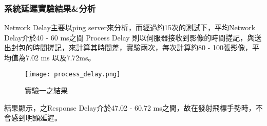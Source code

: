 \subsubsection{系統延遲實驗結果\&分析}
Network Delay主要以ping server來分析，而經過約15次的測試下，平均Network Delay介於40 - 60 ms之間
Process Delay 則以伺服器接收到影像的時間搓記，與送出封包的時間搓記，來計算其時間差，實驗兩次，每次計算約80 - 100張影像，平均值為7.02 ms 以及7.72ms。

\begin{figure}[h]
    \centering	
    \texttt{[image: process\_delay.png]}
    \caption{實驗一之結果}
    \label{fig:Process delay bar chart}
\end{figure}

結果顯示，之Response Delay介於47.02 - 60.72 ms之間，故在發射飛標手勢時，不會感到明顯延遲。

